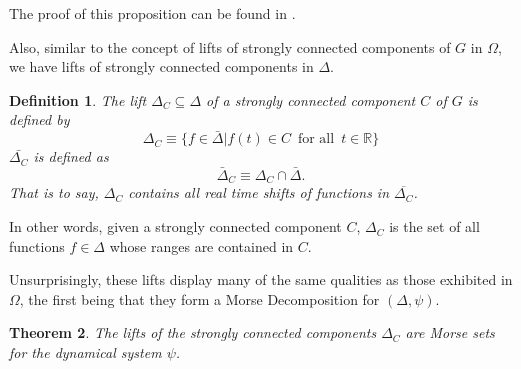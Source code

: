 \documentclass[11pt]{article}
\newtheorem{thm}{Theorem}
\newtheorem{defn}[thm]{Definition}
\def\mcP{{\mathcal{P}}}
\def\g{{\gamma}}
\def\a{{\alpha}}
\def\be{{\beta}}
\begin{document}
The proof of this proposition can be found in \cite{Kliemann}.


Also, similar to the concept of lifts of strongly connected components of $G$ in $\Omega$, we have lifts of strongly connected components in $\Delta$.

\begin{defn}\label{lifts}
The lift $\Delta_C \subseteq\Delta$ of a strongly connected component $C$ of $G$ is defined by
$$
\Delta_C \equiv \{ f \in \bar\Delta | f(t) \in C \, \mbox{ for all }\, t \in \mathbb{R} \}
$$
$\bar{\Delta_C}$ is defined as 
$$
\bar\Delta_C \equiv \Delta_C \cap \bar\Delta.
$$
That is to say, $\Delta_C$ contains all real time shifts of functions in $\overline{\Delta_C}$. 
\end{defn}
In other words, given a strongly connected component $C$, $\Delta_C$ is the set of all functions $f\in\Delta$ whose ranges are contained in $C$. 


Unsurprisingly, these lifts display many of the same qualities as those exhibited in $\Omega$, the first being that they form a Morse Decomposition for $(\Delta,\psi).$ 

\begin{comment}
\begin{defn}\label{def 11}A vertex $\a\in V$ is variant if there exists no $\g\in\mcP$ containing $\a$ which has $\g_1 =\g_F$.
\end{defn}

\begin{defn}\label{def 12}A vertex $\be\in V$ is invariant if every $\g\in\mcP$ containing $\be$ has $\g_F=\be$.
\end{defn} 
\end{comment}


\begin{thm}\label{morse1}
The lifts of the strongly connected components $\Delta_C$ are Morse sets for the dynamical system $\psi$.
\end{thm}
\end{document}
